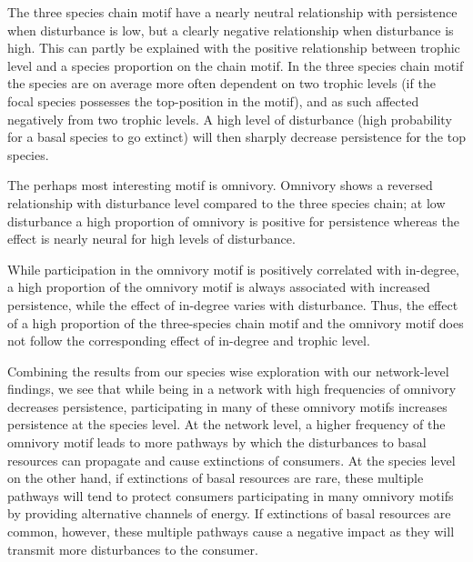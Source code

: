 \documentclass[12pt]{article}
\begin{document}
\begin{spacing}{2.0}
The three species chain motif have a nearly neutral relationship with persistence when disturbance is low, but a clearly negative relationship when disturbance is high. This can partly be explained with the positive relationship between trophic level and a species proportion on the chain motif. In the three species chain motif the species are on average more often dependent on two trophic levels (if the focal species possesses the top-position in the motif), and as such affected negatively from two trophic levels. A high level of disturbance (high probability for a basal species to go extinct) will then sharply decrease persistence for the top species. 



The perhaps most interesting motif is omnivory. Omnivory shows a reversed relationship with disturbance level compared to the three species chain; at low disturbance a high proportion of omnivory is positive for persistence whereas the effect is nearly neural for high levels of disturbance.    


While participation in the omnivory motif is positively correlated with in-degree, a high proportion of the omnivory motif is always associated with increased persistence, while the effect of in-degree varies with disturbance. 
Thus, the effect of a high proportion of the three-species chain motif and the omnivory motif does not follow the corresponding effect of in-degree and trophic level. 

Combining the results from our species wise exploration with our network-level findings, we see that while being in a network with high frequencies of omnivory decreases persistence, participating in many of these omnivory motifs increases persistence at the species level.
At the network level, a higher frequency of the omnivory motif leads to more pathways by which the disturbances to basal resources can propagate and cause extinctions of consumers.
At the species level on the other hand, if extinctions of basal resources are rare, these multiple pathways will tend to protect consumers participating in many omnivory motifs by providing alternative channels of energy.
If extinctions of basal resources are common, however, these multiple pathways cause a negative impact as they will transmit more disturbances to the consumer.


\end{spacing}
\end{document}
